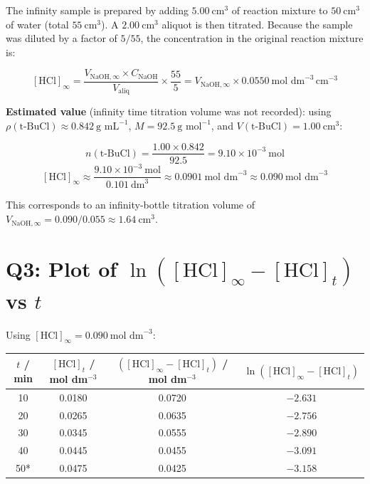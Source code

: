 \documentclass[12pt,a4paper]{article}
\begin{document}
The infinity sample is prepared by adding $5.00\ \text{cm}^3$ of reaction mixture to $50\ \text{cm}^3$ of water
(total $55\ \text{cm}^3$). A $2.00\ \text{cm}^3$ aliquot is then titrated. Because the sample was diluted
by a factor of $5/55$, the concentration in the original reaction mixture is:

\[
  [\text{HCl}]_\infty
  = \frac{V_{\text{NaOH},\infty} \times C_\text{NaOH}}{V_\text{aliq}}
    \times \frac{55}{5}
  = V_{\text{NaOH},\infty} \times 0.0550\ \text{mol dm}^{-3}\,\text{cm}^{-3}
\]

\textbf{Estimated value} (infinity time titration volume was not recorded):
using $\rho(\text{t-BuCl}) \approx 0.842\ \text{g mL}^{-1}$, $M = 92.5\ \text{g mol}^{-1}$,
and $V(\text{t-BuCl}) = 1.00\ \text{cm}^3$:

\[
  n(\text{t-BuCl})
  = \frac{1.00 \times 0.842}{92.5}
  = 9.10 \times 10^{-3}\ \text{mol}
\]
\[
  [\text{HCl}]_\infty
  \approx \frac{9.10 \times 10^{-3}\ \text{mol}}{0.101\ \text{dm}^3}
  \approx \boxed{0.0901\ \text{mol dm}^{-3} \approx 0.090\ \text{mol dm}^{-3}}
\]

This corresponds to an infinity-bottle titration volume of
$V_{\text{NaOH},\infty} = 0.090/0.055 \approx 1.64\ \text{cm}^3$.

\section*{Q3: Plot of $\ln([\text{HCl}]_\infty - [\text{HCl}]_t)$ vs $t$}

Using $[\text{HCl}]_\infty = 0.090\ \text{mol dm}^{-3}$:

\begin{center}
\begin{tabular}{cccc}
\toprule
$t$ / min & $[\text{HCl}]_t$ / mol dm$^{-3}$
          & $([\text{HCl}]_\infty - [\text{HCl}]_t)$ / mol dm$^{-3}$
          & $\ln([\text{HCl}]_\infty - [\text{HCl}]_t)$ \\
\midrule
10  & 0.0180 & 0.0720 & $-2.631$ \\
20  & 0.0265 & 0.0635 & $-2.756$ \\
30  & 0.0345 & 0.0555 & $-2.890$ \\
40  & 0.0445 & 0.0455 & $-3.091$ \\
50* & 0.0475 & 0.0425 & $-3.158$ \\
\bottomrule
\end{tabular}
\end{center}
\end{document}

